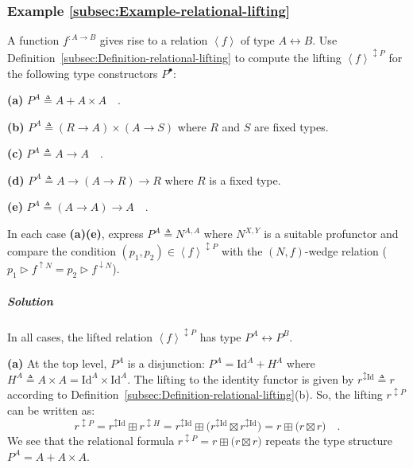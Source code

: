 \subsubsection{Example \label{subsec:Example-relational-lifting}\ref{subsec:Example-relational-lifting}}

A function $f^{:A\rightarrow B}$ gives rise to a relation $\left<f\right>$
of type $A\leftrightarrow B$. Use Definition~\ref{subsec:Definition-relational-lifting}
to compute the lifting $\left<f\right>^{\updownarrow P}$ for the
following type constructors $P^{\bullet}$:

\textbf{(a)} $P^{A}\triangleq A+A\times A\quad$.

\textbf{(b)} $P^{A}\triangleq(R\rightarrow A)\times(A\rightarrow S)$
where $R$ and $S$ are fixed types.

\textbf{(c)} $P^{A}\triangleq A\rightarrow A\quad$.

\textbf{(d)} $P^{A}\triangleq A\rightarrow\left(A\rightarrow R\right)\rightarrow R$
where $R$ is a fixed type.

\textbf{(e)} $P^{A}\triangleq\left(A\rightarrow A\right)\rightarrow A\quad$.

In each case \textbf{(a)}\textendash \textbf{(e)}, express $P^{A}\triangleq N^{A,A}$
where $N^{X,Y}$ is a suitable profunctor and compare the condition
$(p_{1},p_{2})\in\left<f\right>^{\updownarrow P}$ with the $\left(N,f\right)$-wedge
relation ($p_{1}\triangleright f^{\uparrow N}=p_{2}\triangleright f^{\downarrow N}$). 

\subparagraph{Solution}

In all cases, the lifted relation $\left<f\right>^{\updownarrow P}$
has type $P^{A}\leftrightarrow P^{B}$.

\textbf{(a)} At the top level, $P^{A}$ is a disjunction: $P^{A}=\text{Id}^{A}+H^{A}$
where $H^{A}\triangleq A\times A=\text{Id}^{A}\times\text{Id}^{A}$.
The lifting to the identity functor is given by $r^{\updownarrow\text{Id}}\triangleq r$
according to Definition~\ref{subsec:Definition-relational-lifting}(b).
So, the lifting $r^{\updownarrow P}$ can be written as:
\[
r^{\updownarrow P}=r^{\updownarrow\text{Id}}\boxplus r^{\updownarrow H}=r^{\updownarrow\text{Id}}\boxplus\big(r^{\updownarrow\text{Id}}\boxtimes r^{\updownarrow\text{Id}}\big)=r\boxplus\big(r\boxtimes r\big)\quad.
\]
We see that the relational formula $r^{\updownarrow P}=r\boxplus\big(r\boxtimes r\big)$
repeats the type structure $P^{A}=A+A\times A$.

